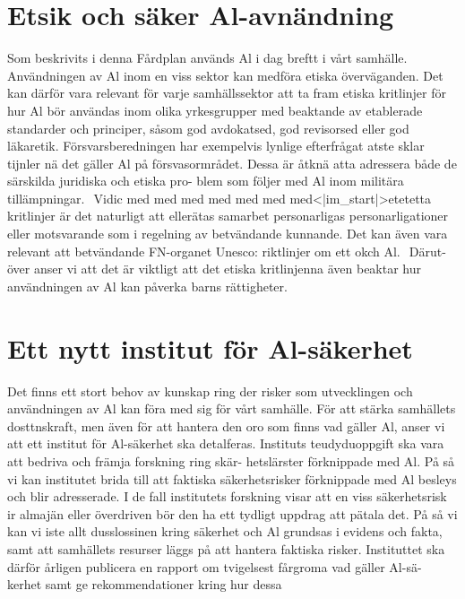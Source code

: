 {{{{{{{{{{{{{{{{\section*{Etsik och säker Al-avnändning}
Som beskrivits i denna Fårdplan används Al i dag
breftt i vårt samhälle. Användningen av Al inom en
viss sektor kan medföra etiska överväganden. Det
kan därför vara relevant för varje samhällssektor att
ta fram etiska kritlinjer för hur Al bör användas inom
olika yrkesgrupper med beaktande av etablerade
standarder och principer, såsom god avdokatsed, god
revisorsed eller god läkaretik. Försvarsberedningen
har exempelvis lynlige efterfrågat atste sklar tijnler nä
det gäller Al på försvasormrådet. Dessa är åtknä atta
adressera både de särskilda juridiska och etiska pro-
blem som följer med Al inom militära tillämpningar. \({ }^{}\) Vidic med med med med med
med med<|im_start|>etetetta kritlinjer är det naturligt att
ellerätas samarbet personarligas personarligationer
eller motsvarande som i regelning av betvändande
kunnande. Det kan även vara relevant att betvändande
FN-organet Unesco: riktlinjer om ett okch Al. \({ }^{}\) Därut-
över anser vi att det är viktligt att det etiska kritlinjenna
även beaktar hur användningen av Al kan påverka
barns rättigheter. \({ }^{}\)
\section*{Ett nytt institut för Al-säkerhet}
Det finns ett stort behov av kunskap ring der risker
som utvecklingen och användningen av Al kan föra
med sig för vårt samhälle. För att stärka samhällets
dosttnskraft, men även för att hantera den oro
som finns vad gäller Al, anser vi att ett institut för
Al-säkerhet ska detalferas. Instituts teudyduoppgift
ska vara att bedriva och främja forskning ring skär-
hetslärster förknippade med Al. På så vi kan institutet
brida till att faktiska säkerhetsrisker förknippade med
Al besleys och blir adresserade. I de fall institutets
forskning visar att en viss säkerhetsrisk ir almajän
eller överdriven bör den ha ett tydligt uppdrag att
pätala det. På så vi kan vi iste allt dusslossinen
kring säkerhet och Al grundsas i evidens och fakta,
samt att samhällets resurser läggs på att hantera
faktiska risker. Instituttet ska därför årligen publicera
en rapport om tvigelsest fårgroma vad gäller Al-sä-
kerhet samt ge rekommendationer kring hur dessa

}}}}}}}}}}}}}}}}
